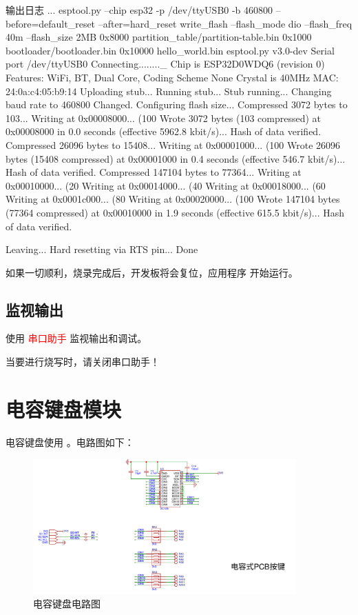 \documentclass[lang=cn,newtx,10pt,scheme=chinese]{elegantbook}
\begin{document}
\begin{mycode}{输出日志}
...
esptool.py --chip esp32 -p /dev/ttyUSB0 -b 460800 --before=default_reset --after=hard_reset write_flash --flash_mode dio --flash_freq 40m --flash_size 2MB 0x8000 partition_table/partition-table.bin 0x1000 bootloader/bootloader.bin 0x10000 hello_world.bin
esptool.py v3.0-dev
Serial port /dev/ttyUSB0
Connecting........_
Chip is ESP32D0WDQ6 (revision 0)
Features: WiFi, BT, Dual Core, Coding Scheme None
Crystal is 40MHz
MAC: 24:0a:c4:05:b9:14
Uploading stub...
Running stub...
Stub running...
Changing baud rate to 460800
Changed.
Configuring flash size...
Compressed 3072 bytes to 103...
Writing at 0x00008000... (100 %
Wrote 3072 bytes (103 compressed) at 0x00008000 in 0.0 seconds (effective 5962.8 kbit/s)...
Hash of data verified.
Compressed 26096 bytes to 15408...
Writing at 0x00001000... (100 %
Wrote 26096 bytes (15408 compressed) at 0x00001000 in 0.4 seconds (effective 546.7 kbit/s)...
Hash of data verified.
Compressed 147104 bytes to 77364...
Writing at 0x00010000... (20 %
Writing at 0x00014000... (40 %
Writing at 0x00018000... (60 %
Writing at 0x0001c000... (80 %
Writing at 0x00020000... (100 %
Wrote 147104 bytes (77364 compressed) at 0x00010000 in 1.9 seconds (effective 615.5 kbit/s)...
Hash of data verified.

Leaving...
Hard resetting via RTS pin...
Done
\end{mycode}

如果一切顺利，烧录完成后，开发板将会复位，应用程序  开始运行。

\section{监视输出}

使用 \textcolor{red}{串口助手} 监视输出和调试。

\begin{marker}
当要进行烧写时，请关闭串口助手！
\end{marker}

\chapter{电容键盘模块}

电容键盘使用  。电路图如下：

\begin{figure}[!htb]
\centering
\includegraphics[width=0.9\textwidth]{keyboard.png}
\caption{电容键盘电路图}
\end{figure}
\end{document}
